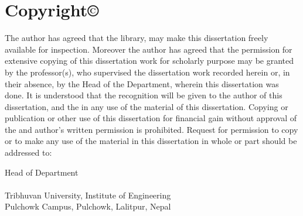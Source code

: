 \newpage
\chapter*{Copyright\copyright}
{}
The author has agreed that the library, \addressname \hspace{1pt} may make this dissertation freely available for inspection. Moreover the author has agreed that the permission for extensive copying of this dissertation work for scholarly purpose may be granted by the professor(s), who supervised the dissertation work recorded herein or, in their absence, by the Head of the Department, wherein this dissertation was done. It is understood that the recognition will be given to the author of this dissertation, and the \addressname\hspace{0in} in any use of the material of this dissertation. Copying or publication or other use of this dissertation for financial gain without approval of the \addressname\hspace{0in} and author's written permission is prohibited.
Request for permission to copy or to make any use of the material in this dissertation in whole or part should be addressed to:\par
\vspace{2cm}
Head of Department\\
\deptname\\
Tribhuvan University, Institute of Engineering\\ Pulchowk Campus, Pulchowk, Lalitpur, Nepal

\cleardoublepage

